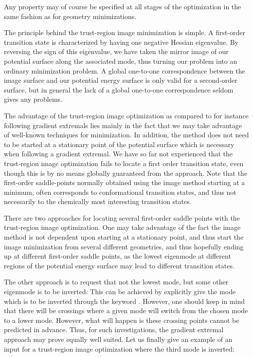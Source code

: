 Any property may of course be specified at all stages of the
optimization in the same fashion as for geometry minimizations.

The principle behind the trust-region image minimization is simple. A
first-order transition state is characterized by having one negative
Hessian eigenvalue. By reversing the sign of this
eigenvalue, we have
taken the mirror image of our potential surface along the associated
mode, thus turning our problem into an ordinary
minimization problem. A global one-to-one correspondence between the
image surface and our potential energy surface is only valid for a
second-order surface, but in general the lack of a global one-to-one
correspondence seldom gives any problems.

The advantage of the trust-region image optimization as compared to
for instance following gradient extremals
lies mainly in the
fact that we may take advantage of well-known techniques for
minimization. In addition, the method does not need to be started at
a stationary point of the potential surface which is necessary when
following a gradient extremal. We
have so far not experienced that the trust-region image optimization
fails to locate a first order transition state, even though this is by
no means globally guaranteed from the approach. Note that the
first-order saddle-points normally obtained using the image method
starting at a minimum, often corresponds to conformational transition
states, and thus not necessarily to the chemically most interesting
transition states.

There are two approaches for locating several first-order saddle
points with the trust-region image optimization. One may take
advantage of the fact the image method is not dependent upon starting
at a stationary point, and thus start the image minimization from
several different geometries, and thus hopefully ending up at different
first-order saddle points, as the lowest eigenmode
at different
regions of the potential energy surface may lead to different
transition states.

The other approach is to request
that not the lowest mode, but some other eigenmode is to be inverted.
This can be achieved by explicitly give the mode which is to be
inverted through the keyword . However, one
should keep in mind that there will be crossings where a given mode
will switch from the chosen mode to a lower mode. However, what will happen
is these crossing points cannot be predicted in advance. Thus, for such
investigations, the gradient extremal approach may prove equally well
suited. Let us finally give an example of an input for a trust-region
image optimization where the third mode is inverted:

